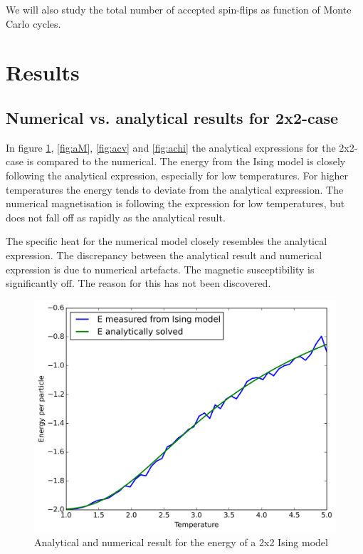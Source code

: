 \documentclass[11pt,a4paper,english,draft]{article}
\numberwithin{equation}{section}
\newcommand{\figurewidth}{.85\textwidth}
\begin{document}
We will also study the total number of accepted spin-flips as function of 
Monte Carlo cycles.

\section{Results}

\subsection{Numerical vs. analytical results for 2x2-case}

In figure \ref{fig:aE}, \ref{fig:aM}, \ref{fig:acv} and \ref{fig:achi}
the analytical expressions for the 2x2-case is compared to the numerical.
The energy from the Ising model is closely following the analytical 
expression, especially for low temperatures. For higher temperatures
the energy tends to deviate from the analytical expression. The 
numerical magnetisation is following the expression for low 
temperatures, but does not fall off as rapidly as the analytical result.

The specific heat for the numerical model closely resembles the analytical
expression. The discrepancy between the analytical result and numerical 
expression is due to numerical artefacts. The magnetic susceptibility
is significantly off. The reason for this has not been discovered.


\begin{figure}
\centering
\includegraphics[width=\figurewidth]{pics/aE.png}
\caption{Analytical and numerical result for the energy 
of a 2x2 Ising model}
\label{fig:aE}
\end{figure}
\end{document}
